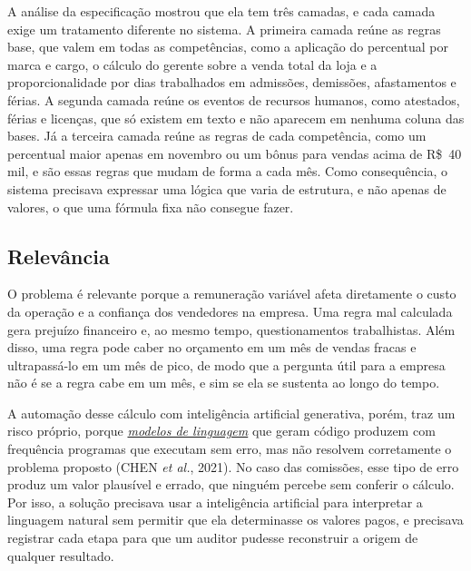 \documentclass[12pt,a4paper]{article}
\newcommand{\termo}[2]{\hyperlink{gls:#1}{\textit{#2}}}
\begin{document}
A análise da especificação mostrou que ela tem três camadas, e cada camada exige um tratamento diferente no sistema. A primeira camada reúne as regras base, que valem em todas as competências, como a aplicação do percentual por marca e cargo, o cálculo do gerente sobre a venda total da loja e a proporcionalidade por dias trabalhados em admissões, demissões, afastamentos e férias. A segunda camada reúne os eventos de recursos humanos, como atestados, férias e licenças, que só existem em texto e não aparecem em nenhuma coluna das bases. Já a terceira camada reúne as regras de cada competência, como um percentual maior apenas em novembro ou um bônus para vendas acima de R\$~40 mil, e são essas regras que mudam de forma a cada mês. Como consequência, o sistema precisava expressar uma lógica que varia de estrutura, e não apenas de valores, o que uma fórmula fixa não consegue fazer.

\subsection{Relevância}

O problema é relevante porque a remuneração variável afeta diretamente o custo da operação e a confiança dos vendedores na empresa. Uma regra mal calculada gera prejuízo financeiro e, ao mesmo tempo, questionamentos trabalhistas. Além disso, uma regra pode caber no orçamento em um mês de vendas fracas e ultrapassá-lo em um mês de pico, de modo que a pergunta útil para a empresa não é se a regra cabe em um mês, e sim se ela se sustenta ao longo do tempo.

A automação desse cálculo com inteligência artificial generativa, porém, traz um risco próprio, porque \termo{modelo}{modelos de linguagem} que geram código produzem com frequência programas que executam sem erro, mas não resolvem corretamente o problema proposto (CHEN \textit{et al.}, 2021). No caso das comissões, esse tipo de erro produz um valor plausível e errado, que ninguém percebe sem conferir o cálculo. Por isso, a solução precisava usar a inteligência artificial para interpretar a linguagem natural sem permitir que ela determinasse os valores pagos, e precisava registrar cada etapa para que um auditor pudesse reconstruir a origem de qualquer resultado.

\end{document}
